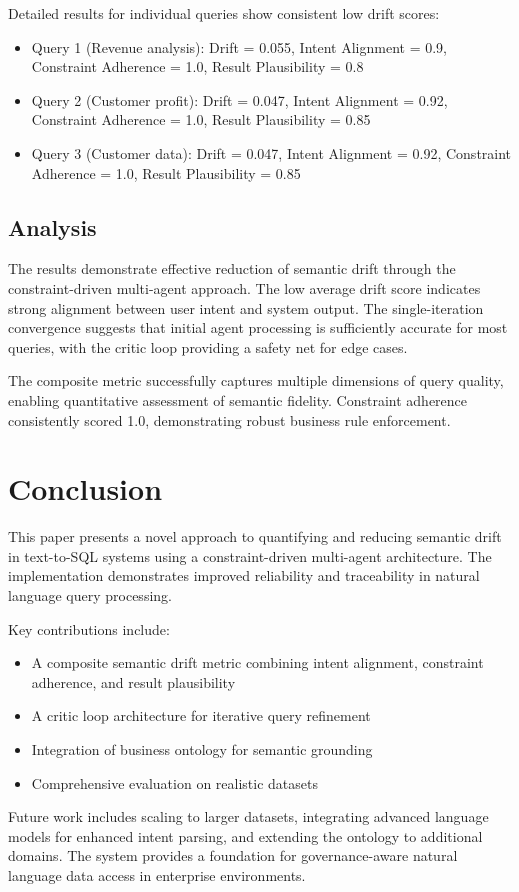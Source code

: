 \documentclass[conference]{IEEEtran}
\begin{document}
Detailed results for individual queries show consistent low drift scores:
\begin{itemize}
\item Query 1 (Revenue analysis): Drift = 0.055, Intent Alignment = 0.9, Constraint Adherence = 1.0, Result Plausibility = 0.8
\item Query 2 (Customer profit): Drift = 0.047, Intent Alignment = 0.92, Constraint Adherence = 1.0, Result Plausibility = 0.85
\item Query 3 (Customer data): Drift = 0.047, Intent Alignment = 0.92, Constraint Adherence = 1.0, Result Plausibility = 0.85
\end{itemize}

\subsection{Analysis}

The results demonstrate effective reduction of semantic drift through the constraint-driven multi-agent approach. The low average drift score indicates strong alignment between user intent and system output. The single-iteration convergence suggests that initial agent processing is sufficiently accurate for most queries, with the critic loop providing a safety net for edge cases.

The composite metric successfully captures multiple dimensions of query quality, enabling quantitative assessment of semantic fidelity. Constraint adherence consistently scored 1.0, demonstrating robust business rule enforcement.

\section{Conclusion}
\label{sec:conclusion}

This paper presents a novel approach to quantifying and reducing semantic drift in text-to-SQL systems using a constraint-driven multi-agent architecture. The implementation demonstrates improved reliability and traceability in natural language query processing.

Key contributions include:
\begin{itemize}
\item A composite semantic drift metric combining intent alignment, constraint adherence, and result plausibility
\item A critic loop architecture for iterative query refinement
\item Integration of business ontology for semantic grounding
\item Comprehensive evaluation on realistic datasets
\end{itemize}

Future work includes scaling to larger datasets, integrating advanced language models for enhanced intent parsing, and extending the ontology to additional domains. The system provides a foundation for governance-aware natural language data access in enterprise environments.



\end{document}
